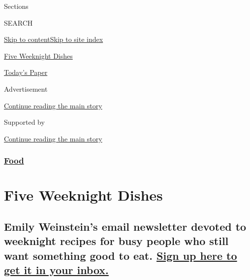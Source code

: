 Sections

SEARCH

\protect\hyperlink{site-content}{Skip to
content}\protect\hyperlink{site-index}{Skip to site index}

\href{https://www.nytimes3xbfgragh.onion/column/five-weeknight-dishes}{Five
Weeknight Dishes}

\href{https://myaccount.nytimes3xbfgragh.onion/auth/login?response_type=cookie\&client_id=vi}{}

\href{https://www.nytimes3xbfgragh.onion/section/todayspaper}{Today's
Paper}

Advertisement

\protect\hyperlink{after-top}{Continue reading the main story}

Supported by

\protect\hyperlink{after-sponsor}{Continue reading the main story}

\hypertarget{food}{%
\subsubsection{\texorpdfstring{\href{/section/food}{Food}}{Food}}\label{food}}

\hypertarget{five-weeknight-dishes}{%
\section{Five Weeknight Dishes}\label{five-weeknight-dishes}}

\hypertarget{emily-weinsteins-email-newsletter-devoted-to-weeknight-recipes-for-busy-people-who-still-want-something-good-to-eat-sign-up-here-to-get-it-in-your-inbox}{%
\subsection{\texorpdfstring{Emily Weinstein's email newsletter devoted
to weeknight recipes for busy people who still want something good to
eat.
\href{https://www.nytimes3xbfgragh.onion/newsletters/five-weeknight-dishes}{Sign
up here to get it in your
inbox.}}{Emily Weinstein's email newsletter devoted to weeknight recipes for busy people who still want something good to eat. Sign up here to get it in your inbox.}}\label{emily-weinsteins-email-newsletter-devoted-to-weeknight-recipes-for-busy-people-who-still-want-something-good-to-eat-sign-up-here-to-get-it-in-your-inbox}}

